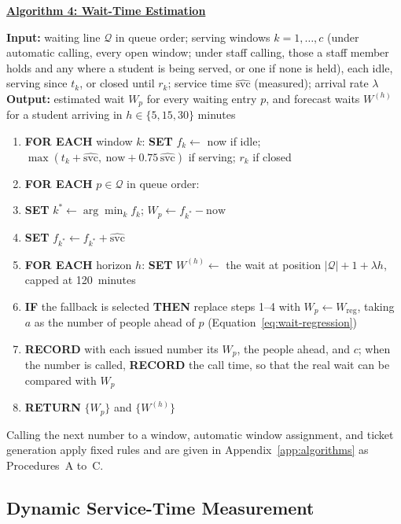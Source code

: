 \documentclass{research}
\newenvironment{algsteps}
  {\setlength{\topsep}{2pt}\begin{enumerate}%
   \setlength{\itemsep}{0pt}\setlength{\parsep}{0pt}}
  {\end{enumerate}}
\begin{document}
\noindent\textbf{\underline{Algorithm 4: Wait-Time Estimation}}

\noindent\textbf{Input:} waiting line $\mathcal{Q}$ in queue order;
serving windows $k = 1,\ldots,c$ (under automatic calling, every open
window; under staff calling, those a staff member holds and any where a
student is being served, or one if none is held), each idle, serving
since $t_k$, or closed until $r_k$; service time
$\widehat{\mathrm{svc}}$ (measured); arrival rate $\lambda$\\
\noindent\textbf{Output:} estimated wait $W_p$ for every waiting entry
$p$, and forecast waits $W^{(h)}$ for a student arriving in
$h \in \{5, 15, 30\}$ minutes

\begin{algsteps}
  \item \textbf{FOR EACH} window $k$: \textbf{SET} $f_k \gets$ now if
        idle; $\max(t_k + \widehat{\mathrm{svc}},\ \text{now} +
        0.75\,\widehat{\mathrm{svc}})$ if serving; $r_k$ if closed
  \item \textbf{FOR EACH} $p \in \mathcal{Q}$ in queue order:
  \item \quad \textbf{SET} $k^{*} \gets \arg\min_k f_k$;
        $W_p \gets f_{k^{*}} - \text{now}$
  \item \quad \textbf{SET} $f_{k^{*}} \gets f_{k^{*}} +
        \widehat{\mathrm{svc}}$
  \item \textbf{FOR EACH} horizon $h$: \textbf{SET} $W^{(h)} \gets$ the
        wait at position $|\mathcal{Q}| + 1 + \lambda h$, capped at
        120~minutes
  \item \textbf{IF} the fallback is selected \textbf{THEN} replace steps
        1--4 with $W_p \gets W_{\mathrm{reg}}$, taking $a$ as the number
        of people ahead of $p$ (Equation~\ref{eq:wait-regression})
  \item \textbf{RECORD} with each issued number its $W_p$, the people
        ahead, and $c$; when the number is called, \textbf{RECORD} the
        call time, so that the real wait can be compared with $W_p$
  \item \textbf{RETURN} $\{W_p\}$ and $\{W^{(h)}\}$
\end{algsteps}
\vspace{0.3em}

\noindent Calling the next number to a window, automatic window
assignment, and ticket generation apply fixed rules and are given in
Appendix~\ref{app:algorithms} as Procedures~A to~C.

\subsection{Dynamic Service-Time Measurement}
\label{sec:dynamic-service-time-method}
\end{document}
